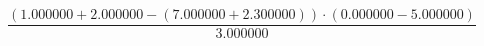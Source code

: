 \documentclass{article}
\begin{document}
$$\frac{(1.000000 + 2.000000 - (7.000000 + 2.300000)) \cdot (0.000000 - 5.000000)}{3.000000}$$
\end{document}
